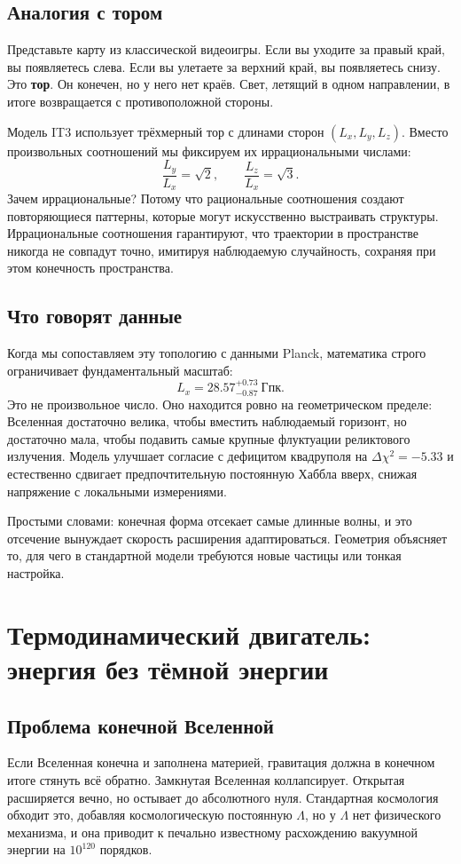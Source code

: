 \documentclass[12pt,a4paper]{report}
\begin{document}
\section{Аналогия с тором}
Представьте карту из классической видеоигры. Если вы уходите за правый край, вы появляетесь слева. Если вы улетаете за верхний край, вы появляетесь снизу. Это \textbf{тор}. Он конечен, но у него нет краёв. Свет, летящий в одном направлении, в итоге возвращается с противоположной стороны.

Модель IT3 использует трёхмерный тор с длинами сторон $(L_x, L_y, L_z)$. Вместо произвольных соотношений мы фиксируем их иррациональными числами:
$$
\frac{L_y}{L_x} = \sqrt{2}, \qquad \frac{L_z}{L_x} = \sqrt{3}.
$$
Зачем иррациональные? Потому что рациональные соотношения создают повторяющиеся паттерны, которые могут искусственно выстраивать структуры. Иррациональные соотношения гарантируют, что траектории в пространстве никогда не совпадут точно, имитируя наблюдаемую случайность, сохраняя при этом конечность пространства.

\section{Что говорят данные}
Когда мы сопоставляем эту топологию с данными Planck, математика строго ограничивает фундаментальный масштаб:
$$
L_x = 28.57^{+0.73}_{-0.87}~\mathrm{Гпк}.
$$
Это не произвольное число. Оно находится ровно на геометрическом пределе: Вселенная достаточно велика, чтобы вместить наблюдаемый горизонт, но достаточно мала, чтобы подавить самые крупные флуктуации реликтового излучения. Модель улучшает согласие с дефицитом квадруполя на $\Delta\chi^2 = -5.33$ и естественно сдвигает предпочтительную постоянную Хаббла вверх, снижая напряжение с локальными измерениями.

Простыми словами: конечная форма отсекает самые длинные волны, и это отсечение вынуждает скорость расширения адаптироваться. Геометрия объясняет то, для чего в стандартной модели требуются новые частицы или тонкая настройка.

\chapter{Термодинамический двигатель: энергия без тёмной энергии}
\section{Проблема конечной Вселенной}
Если Вселенная конечна и заполнена материей, гравитация должна в конечном итоге стянуть всё обратно. Замкнутая Вселенная коллапсирует. Открытая расширяется вечно, но остывает до абсолютного нуля. Стандартная космология обходит это, добавляя космологическую постоянную $\Lambda$, но у $\Lambda$ нет физического механизма, и она приводит к печально известному расхождению вакуумной энергии на $10^{120}$ порядков.
\end{document}
